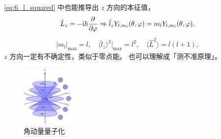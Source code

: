 \eqref{eq:6_l_squared} 中也能推导出 $z$ 方向的本征值，
\begin{align}
    \hat L_z = -\mathrm{i}\hbar \pdv{\varphi} \Rightarrow \hat l_z Y_{l,m_l}(\theta, \varphi) = m_l Y_{l,m_l}(\theta, \varphi), 
\end{align}
\begin{align}
    |m_l|_{\mathrm{max}} = l, \quad \langle \hat l_z \rangle^2 |_{\mathrm{max}} = l^2, 
    \quad \langle \hat L^2 \rangle = l(l+1),
\end{align}
$z$ 方向一定有不确定性，类似于零点能。
也可以理解成「测不准原理」。
\begin{figure}
    \centering
    \includegraphics[height=3cm]{fig/angular_momentum_Wikipedia.pdf}
    \caption{角动量量子化}
\end{figure}


